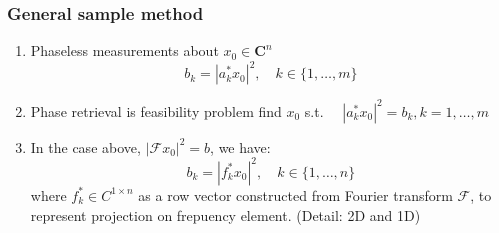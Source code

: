 \documentclass[UTF8]{beamer}
\begin{document}
\begin{frame}[c]\frametitle{General sample method}

\begin{enumerate}


\item Phaseless measurements about $x_{0} \in \mathbf{C}^{n}$
$$
b_{k}=| a_{k}^* x_{0}|^{2}, \quad k \in\{1, \ldots, m\}
$$
\item Phase retrieval is feasibility problem
find $x_0$
s.t. $\quad | a_{k}^* x_{0}|^{2}=b_{k}, k=1, \ldots, m$

\item In the case above, $|\mathcal{F}x_0|^2 = b$,
we have:
$$
b_k = |f_k^*x_0|^2,  \quad k \in\{1, \ldots, n\}
$$
where $f_k^* \in C^{1 \times n}$ as a row vector  constructed from Fourier transform $\mathcal{F}$, to represent projection on frepuency element.
(Detail: 2D and 1D)

\end{enumerate}

\end{frame}
\end{document}
